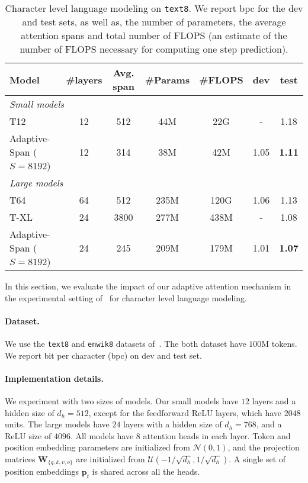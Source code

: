 \documentclass[11pt,a4paper]{article}
\begin{document}
\begin{table*}[t]
\centering
\begin{tabular}{lcccccc}
  \toprule
  Model & \#layers & Avg. span & \#Params & \#FLOPS & dev & test \\
  \midrule
  \multicolumn{6}{l}{\emph{Small models}}\\
  T12~\citep{al2018character} & 12 & 512 & 44M & 22G & - & 1.18\\
  Adaptive-Span ($S=8192$) & 12  & 314 & 38M & 42M & 1.05 & \bf 1.11 \\
  \midrule
  \multicolumn{6}{l}{\emph{Large models}}\\
  T64~\citep{al2018character} & 64 & 512 & 235M & 120G & 1.06 & 1.13\\
  T-XL~\citep{dai2018transformer} & 24 & 3800 & 277M & 438M & - & 1.08\\
  Adaptive-Span ($S=8192$) & 24 & 245 & 209M & 179M & 1.01 & \bf 1.07 \\
  \bottomrule
\end{tabular}
  \caption{
    Character level language modeling on \texttt{text8}.
    We report bpc for the dev and test sets, as well as, the number of parameters, the average attention spans and total number of FLOPS (an estimate of the number of FLOPS necessary for computing one step prediction).
  }
\label{tab:result}
\end{table*}

In this section, we evaluate the impact of our adaptive attention mechanism in the experimental setting of~\citet{al2018character} for character level language modeling.

\paragraph{Dataset.}
We use the \texttt{text8} and \texttt{enwik8} datasets of~\citet{mahoney2011large}. The both dataset have $100$M tokens.
We report bit per character (bpc) on dev and test set.

\paragraph{Implementation details.}
We experiment with two sizes of models.
Our small models have $12$ layers and a hidden size of $d_h=512$, except for the feedforward ReLU layers, which have $2048$ units.
The large models have $24$ layers with a hidden size of $d_h=768$, and a ReLU size of $4096$. All models have $8$ attention heads in each layer.
Token and position embedding parameters are initialized from $\mathcal{N}(0,1)$, and the projection matrices $\mathbf{W}_{\{q,k,v,o\}}$ are initialized from $\mathcal{U}(-1/\sqrt{d_h}, 1/\sqrt{d_h})$.
A single set of position embeddings $\mathbf{p}_t$ is shared across all the heads.
\end{document}
